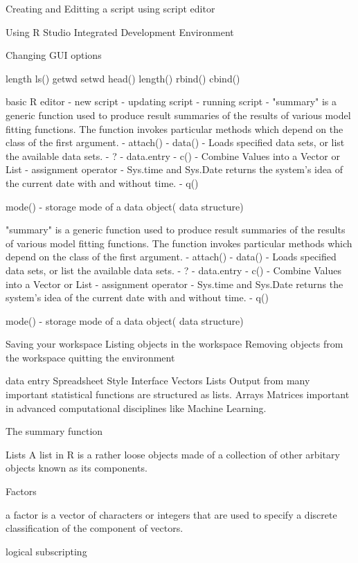 \documentclass[a4paper,12pt]{article}
\begin{document}
Creating and Editting a script using script editor

Using R Studio Integrated Development Environment

Changing GUI options

length
ls()
getwd
setwd
head()
length()
rbind()
cbind()

basic R editor
 - new script
 - updating script
 - running script
 -
"summary" is a generic function used to produce result summaries of the results of various model fitting functions. 
The function invokes particular methods which depend on the class of the first argument. 
  - attach()
  - data()
   - Loads specified data sets, or list the available data sets. 
  - ?
  - data.entry
  - c()
- Combine Values into a Vector or List
  - assignment operator
  - Sys.time and Sys.Date returns the system's idea of the current date with and without time. 
  - q()


mode() - storage mode of a data object( data structure)

"summary" is a generic function used to produce result summaries of the results of various model fitting functions. 
The function invokes particular methods which depend on the class of the first argument. 
  - attach()
  - data()
   - Loads specified data sets, or list the available data sets. 
  - ?
  - data.entry
  - c()
- Combine Values into a Vector or List
  - assignment operator
  - Sys.time and Sys.Date returns the system's idea of the current date with and without time. 
  - q()


mode() - storage mode of a data object( data structure)





Saving your workspace
Listing objects in the workspace
Removing objects from the workspace
quitting the environment

data entry
Spreadsheet Style Interface
Vectors
Lists
Output from many important statistical functions are structured as lists.
Arrays
Matrices important in advanced computational disciplines like Machine Learning.

 
The summary function


Lists
A list in R is a rather loose objects made of a collection of other arbitary objects known as its components. 








Factors

a factor is a vector of characters or integers that are used to specify a discrete classification of the component of vectors.

logical subscripting
\end{document}
